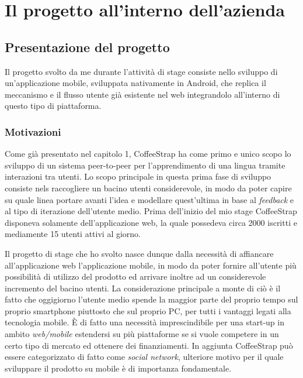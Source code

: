 
\chapter{Il progetto all'interno dell'azienda}
\label{cap:progetto-azienda}

\section{Presentazione del progetto}

Il progetto svolto da me durante l'attività di stage consiste nello sviluppo di un'applicazione mobile, sviluppata nativamente in Android, che replica il meccanismo e il flusso utente già esistente nel web integrandolo all'interno di questo tipo di piattaforma. 

\subsection{Motivazioni}

Come già presentato nel capitolo 1, CoffeeStrap ha come primo e unico scopo lo sviluppo di un sistema peer-to-peer per l'apprendimento di una lingua tramite interazioni tra utenti. Lo scopo principale in questa prima fase di sviluppo consiste nels raccogliere un bacino utenti considerevole, in modo da poter capire su quale linea portare avanti l'idea e modellare quest'ultima in base al \textit{feedback} e al tipo di iterazione dell'utente medio. Prima dell'inizio del mio stage CoffeeStrap disponeva solamente dell'applicazione web, la quale possedeva circa 2000 iscritti e mediamente 15 utenti attivi al giorno. 

Il progetto di stage che ho svolto nasce dunque dalla necessità di affiancare all'applicazione web l'applicazione mobile, in modo da poter fornire all'utente più possibilità di utilizzo del prodotto ed arrivare inoltre ad un considerevole incremento del bacino utenti. La considerazione principale a monte di ciò è il fatto che oggigiorno l'utente medio spende la maggior parte del proprio tempo sul proprio smartphone piuttosto che sul proprio PC, per tutti i vantaggi legati alla tecnologia mobile. È di fatto una necessità imprescindibile per una start-up in ambito \textit{web/mobile} estendersi su più piattaforme se si vuole competere in un certo tipo di mercato ed ottenere dei finanziamenti. In aggiunta CoffeeStrap può essere categorizzato di fatto come \textit{social network}, ulteriore motivo per il quale sviluppare il prodotto su mobile è di importanza fondamentale.

